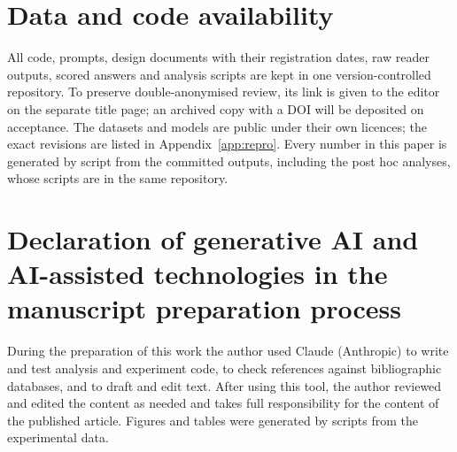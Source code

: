 \section*{Data and code availability}
All code, prompts, design documents with their registration dates, raw reader outputs, scored answers and analysis scripts are kept in one version-controlled repository. To preserve double-anonymised review, its link is given to the editor on the separate title page; an archived copy with a DOI will be deposited on acceptance. The datasets and models are public under their own licences; the exact revisions are listed in Appendix~\ref{app:repro}. Every number in this paper is generated by script from the committed outputs, including the post hoc analyses, whose scripts are in the same repository.

\section*{Declaration of generative AI and AI-assisted technologies in the manuscript preparation process}
During the preparation of this work the author used Claude (Anthropic) to write and test analysis and experiment code, to check references against bibliographic databases, and to draft and edit text. After using this tool, the author reviewed and edited the content as needed and takes full responsibility for the content of the published article. Figures and tables were generated by scripts from the experimental data.
